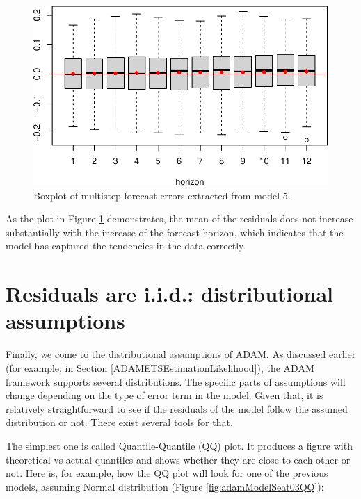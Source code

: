 \documentclass[
]{book}
\theoremstyle{definition}
\theoremstyle{definition}
\theoremstyle{definition}
\theoremstyle{definition}
\theoremstyle{remark}
\begin{document}
\begin{figure}
\centering
\includegraphics{Svetunkov--2022----ADAM_files/figure-latex/adamModelSeat05Multistep-1.pdf}
\caption{\label{fig:adamModelSeat05Multistep}Boxplot of multistep forecast errors extracted from model 5.}
\end{figure}

As the plot in Figure \ref{fig:adamModelSeat05Multistep} demonstrates, the mean of the residuals does not increase substantially with the increase of the forecast horizon, which indicates that the model has captured the tendencies in the data correctly.

\hypertarget{diagnosticsResidualsIIDDistribution}{%
\section{Residuals are i.i.d.: distributional assumptions}\label{diagnosticsResidualsIIDDistribution}}

Finally, we come to the distributional assumptions of ADAM. As discussed earlier (for example, in Section \ref{ADAMETSEstimationLikelihood}), the ADAM framework supports several distributions. The specific parts of assumptions will change depending on the type of error term in the model. Given that, it is relatively straightforward to see if the residuals of the model follow the assumed distribution or not. There exist several tools for that.

The simplest one is called Quantile-Quantile (QQ) plot. It produces a figure with theoretical vs actual quantiles and shows whether they are close to each other or not. Here is, for example, how the QQ plot will look for one of the previous models, assuming Normal distribution (Figure \ref{fig:adamModelSeat03QQ}):
\end{document}
